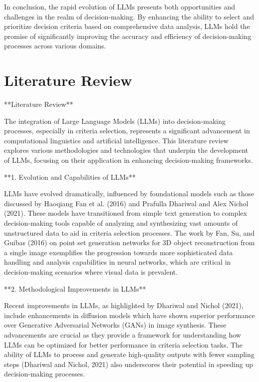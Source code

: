 \documentclass[conference]{IEEEtran}
\begin{document}
In conclusion, the rapid evolution of LLMs presents both opportunities and challenges in the realm of decision-making. By enhancing the ability to select and prioritize decision criteria based on comprehensive data analysis, LLMs hold the promise of significantly improving the accuracy and efficiency of decision-making processes across various domains.

\section{Literature Review}

**Literature Review**

The integration of Large Language Models (LLMs) into decision-making processes, especially in criteria selection, represents a significant advancement in computational linguistics and artificial intelligence. This literature review explores various methodologies and technologies that underpin the development of LLMs, focusing on their application in enhancing decision-making frameworks.

**1. Evolution and Capabilities of LLMs**

LLMs have evolved dramatically, influenced by foundational models such as those discussed by Haoqiang Fan et al. (2016) and Prafulla Dhariwal and Alex Nichol (2021). These models have transitioned from simple text generation to complex decision-making tools capable of analyzing and synthesizing vast amounts of unstructured data to aid in criteria selection processes. The work by Fan, Su, and Guibas (2016) on point set generation networks for 3D object reconstruction from a single image exemplifies the progression towards more sophisticated data handling and analysis capabilities in neural networks, which are critical in decision-making scenarios where visual data is prevalent.

**2. Methodological Improvements in LLMs**

Recent improvements in LLMs, as highlighted by Dhariwal and Nichol (2021), include enhancements in diffusion models which have shown superior performance over Generative Adversarial Networks (GANs) in image synthesis. These advancements are crucial as they provide a framework for understanding how LLMs can be optimized for better performance in criteria selection tasks. The ability of LLMs to process and generate high-quality outputs with fewer sampling steps (Dhariwal and Nichol, 2021) also underscores their potential in speeding up decision-making processes.
\end{document}
